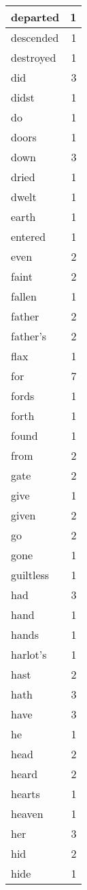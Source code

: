 \begin{center}
\begin{longtable}{l|r}
departed & 1 \\ \hline
descended & 1 \\ \hline
destroyed & 1 \\ \hline
did & 3 \\ \hline
didst & 1 \\ \hline
do & 1 \\ \hline
doors & 1 \\ \hline
down & 3 \\ \hline
dried & 1 \\ \hline
dwelt & 1 \\ \hline
earth & 1 \\ \hline
entered & 1 \\ \hline
even & 2 \\ \hline
faint & 2 \\ \hline
fallen & 1 \\ \hline
father & 2 \\ \hline
father's & 2 \\ \hline
flax & 1 \\ \hline
for & 7 \\ \hline
fords & 1 \\ \hline
forth & 1 \\ \hline
found & 1 \\ \hline
from & 2 \\ \hline
gate & 2 \\ \hline
give & 1 \\ \hline
given & 2 \\ \hline
go & 2 \\ \hline
gone & 1 \\ \hline
guiltless & 1 \\ \hline
had & 3 \\ \hline
hand & 1 \\ \hline
hands & 1 \\ \hline
harlot's & 1 \\ \hline
hast & 2 \\ \hline
hath & 3 \\ \hline
have & 3 \\ \hline
he & 1 \\ \hline
head & 2 \\ \hline
heard & 2 \\ \hline
hearts & 1 \\ \hline
heaven & 1 \\ \hline
her & 3 \\ \hline
hid & 2 \\ \hline
hide & 1 \\ \hline

\end{longtable}
\end{center}
